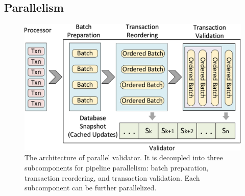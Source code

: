 

\subsection{Parallelism}
\label{sec:parallel}
\label{sec:validator_reordering:parallel}

\begin{figure}[t]
	\centering
	\includegraphics[width=.8\columnwidth]{./figures/validator}
	\caption{The architecture of parallel validator. It is decoupled into three subcomponents for pipeline parallelism: batch preparation, transaction reordering, and transaction validation. Each subcomponent can be further parallelized.}
	\label{fig:reorder:validator}
\end{figure}

